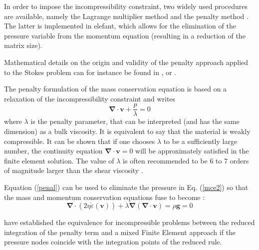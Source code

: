 

In order to impose the incompressibility constraint, two widely used procedures are available, namely the 
Lagrange multiplier method and the penalty method \cite{bathe82,hugh}. The latter is implemented in {\sc elefant}, which allows for the elimination of the pressure variable from the momentum equation (resulting in a reduction of the matrix size).%

Mathematical details on the origin and validity of the penalty approach applied to the Stokes problem can for instance be found in  \cite{cuss86}, \cite{redd82} or \cite{gunz89}.

The penalty formulation of the mass conservation equation is based on a relaxation of the incompressibility constraint and writes 
\begin{equation}
{\bm \nabla}\cdot {\bm v} + \frac{p}{\lambda} = 0 \label{penal}
\end{equation}
where $\lambda$ is the penalty parameter, that can be interpreted (and has the same dimension) as a bulk viscosity. It is 
equivalent to say that the material is weakly compressible. It can be shown that if one chooses $\lambda$ to be a 
sufficiently large number, the continuity equation $ {\bm \nabla}\cdot {\bm v} = 0$ will be approximately satisfied in the finite element solution. The value of $\lambda$ is often recommended to be 6 to 7 orders of magnitude larger than the shear viscosity \cite{dohu03,hulb79}.


Equation (\ref{penal}) can be used to eliminate the pressure in Eq. (\ref{mce2}) so that the mass and momentum conservation equations fuse to become :
\begin{equation}
{\bm \nabla}\cdot ( 2 \eta \dot\varepsilon({\bm v})) + \lambda {\bm \nabla} ({\bm \nabla }\cdot {\bm v}) = \rho {\bm g} = 0 \label{peneq}
\end{equation}

\cite{mahu78} have established the equivalence for incompressible problems between the reduced integration
of the penalty term and a mixed Finite Element approach if the pressure nodes coincide with the integration points of the reduced rule.


